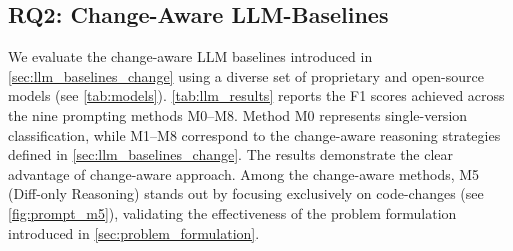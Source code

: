 \documentclass[authoryear,final,5p,times,twocolumn]{elsarticle}
\theoremstyle{plain}
\begin{document}
\begin{table}[!htbp]
\centering
\caption{Comparison of the naive baseline and representative methods using Precision, Recall, F1, and AUC.}
\label{tab:naive_vs_methods}
\small
\setlength{\tabcolsep}{3pt}
\renewcommand{\arraystretch}{1.15}
\end{table}


\subsection{RQ2: Change-Aware LLM-Baselines}
\label{sec:RQ2}
We evaluate the change-aware LLM baselines introduced in \autoref{sec:llm_baselines_change} using a diverse set of proprietary and open-source models (see \autoref{tab:models}). \autoref{tab:llm_results} reports the F1 scores achieved across the nine prompting methods M0–M8. Method M0 represents single-version classification, while M1–M8 correspond to the change-aware reasoning strategies defined in \autoref{sec:llm_baselines_change}. The results demonstrate the clear advantage of change-aware approach.
Among the change-aware methods, M5 (Diff-only Reasoning) stands out by focusing exclusively on code-changes (see \autoref{fig:prompt_m5}), validating the effectiveness of the problem formulation introduced in \autoref{sec:problem_formulation}.
\end{document}
